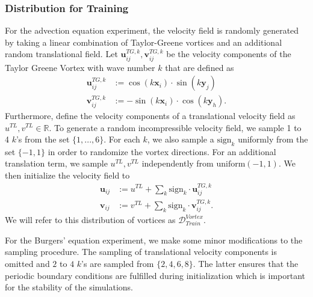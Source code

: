 \subsubsection{Distribution for Training}\label{sec:train_vortices}
For the advection equation experiment, the velocity field is randomly generated by taking a linear combination of Taylor-Greene vortices and an additional random translational field. Let $\boldsymbol u_{ij}^{TG,k}, \boldsymbol v_{ij}^{TG,k}$ be the velocity components of the Taylor Greene Vortex with wave number $k$ that are defined as
\begin{align}
    \boldsymbol u_{ij}^{TG,k} &:= \cos(k\boldsymbol x_{i}) \cdot \sin(k \boldsymbol y_j) \\
    \boldsymbol v_{ij}^{TG,k} &:= - \sin(k\boldsymbol x_i) \cdot \cos(k\boldsymbol y_h).
\end{align}
Furthermore, define the velocity components of a translational velocity field as $u^{TL}, v^{TL} \in \mathbb R$. To generate a random incompressible velocity field, we sample 1 to 4 $k$'s from the set $\{1, ..., 6\}$.
For each $k$, we also sample a $\text{sign}_k$ uniformly from the set $\{-1, 1\}$ in order to randomize the vortex directions. For an additional translation term, we sample $u^{TL}, v^{TL}$ independently from  $\text{uniform}(-1, 1)$. We then initialize the velocity field to
\begin{align}
    \boldsymbol u_{ij} &:= u^{TL} + \sum_k \text{sign}_k \cdot \boldsymbol u_{ij}^{TG,k}\\
    \boldsymbol v_{ij} &:= v^{TL} + \sum_k \text{sign}_k \cdot \boldsymbol v_{ij}^{TG,k}.
\end{align}
We will refer to this distribution of vortices as $\mathcal D^{Vortex}_{Train}$. 

For the Burgers' equation experiment, we make some minor modifications to the sampling procedure. The sampling of translational velocity components is omitted and $2$ to $4$ $k$'s are sampled from $\{2, 4, 6, 8\}$. The latter ensures that the periodic boundary conditions are fulfilled during initialization which is important for the stability of the simulations.

